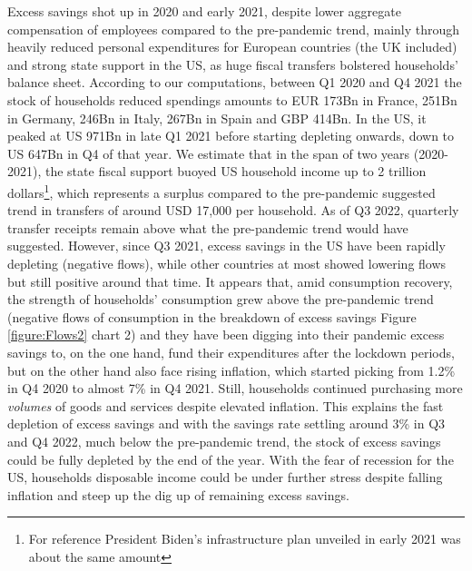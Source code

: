 Excess savings shot up in 2020 and early 2021, despite lower aggregate compensation of employees compared to the pre-pandemic trend, mainly through heavily reduced personal expenditures for European countries (the UK included) and strong state support in the US, as huge fiscal transfers bolstered households’ balance sheet. 
According to our computations, between Q1 2020 and Q4 2021 the stock of households reduced spendings amounts to EUR 173Bn in France, 251Bn in Germany, 246Bn in Italy, 267Bn in Spain and GBP 414Bn. 
In the US, it peaked at US 971Bn in late Q1 2021 before starting depleting onwards, down to US 647Bn in Q4 of that year.
We estimate that in the span of two years (2020-2021), the state fiscal support buoyed US household income up to 2 trillion dollars\footnote{For reference President Biden's infrastructure plan unveiled in early 2021 was about the same amount}, which represents a surplus compared to the pre-pandemic suggested trend in transfers of around USD 17,000 per household. 
As of Q3 2022, quarterly transfer receipts remain above what the pre-pandemic trend would have suggested. 
However, since Q3 2021, excess savings in the US have been rapidly depleting (negative flows), while other countries at most showed lowering flows but still positive around that time. 
It appears that, amid consumption recovery, the strength of households’ consumption grew above the pre-pandemic trend (negative flows of consumption in the breakdown of excess savings Figure \ref{figure:Flows2} chart 2) and they have been digging into their pandemic excess savings to, on the one hand, fund their expenditures after the lockdown periods, but on the other hand also face rising inflation, which started picking from 1.2\% in Q4 2020 to almost 7\% in Q4 2021. 
Still, households continued purchasing more \textit{volumes} of goods and services despite elevated inflation. 
This explains the fast depletion of excess savings and with the savings rate settling around 3\% in Q3 and Q4 2022, much below the pre-pandemic trend, the stock of excess savings could be fully depleted by the end of the year. 
With the fear of recession for the US, households disposable income could be under further stress despite falling inflation and steep up the dig up of remaining excess savings.

